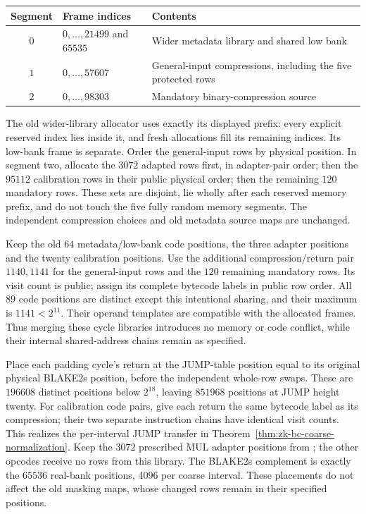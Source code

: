 \begin{center}
\small
\begin{tabular}{@{}cll@{}}
\toprule
Segment & Frame indices & Contents \\
\midrule
$0$ & $0,\ldots,21499$ and $65535$ & Wider metadata library and shared low bank \\
$1$ & $0,\ldots,57607$ & General-input compressions, including the five protected rows \\
$2$ & $0,\ldots,98303$ & Mandatory binary-compression source \\
\bottomrule
\end{tabular}
\end{center}

The old wider-library allocator uses exactly its displayed prefix: every explicit reserved index lies inside it, and fresh allocations fill its remaining indices. Its low-bank frame is separate. Order the general-input rows by physical position. In segment two, allocate the $3072$ adapted rows first, in adapter-pair order; then the $95112$ calibration rows in their public physical order; then the remaining $120$ mandatory rows. These sets are disjoint, lie wholly after each reserved memory prefix, and do not touch the five fully random memory segments. The independent compression choices and old metadata source maps are unchanged.

Keep the old $64$ metadata/low-bank code positions, the three adapter positions and the twenty calibration positions. Use the additional compression/return pair $1140,1141$ for the general-input rows and the $120$ remaining mandatory rows. Its visit count is public; assign its complete bytecode labels in public row order. All $89$ code positions are distinct except this intentional sharing, and their maximum is $1141<2^{11}$. Their operand templates are compatible with the allocated frames. Thus merging these cycle libraries introduces no memory or code conflict, while their internal shared-address chains remain as specified.

Place each padding cycle's return at the JUMP-table position equal to its original physical BLAKE2s position, before the independent whole-row swaps. These are $196608$ distinct positions below $2^{18}$, leaving $851968$ positions at JUMP height twenty. For calibration code pairs, give each return the same bytecode label as its compression; their two separate instruction chains have identical visit counts. This realizes the per-interval JUMP transfer in Theorem~\ref{thm:zk-bc-coarse-normalization}. Keep the $3072$ prescribed MUL adapter positions from ; the other opcodes receive no rows from this library. The BLAKE2s complement is exactly the $65536$ real-bank positions, $4096$ per coarse interval. These placements do not affect the old masking maps, whose changed rows remain in their specified positions.

